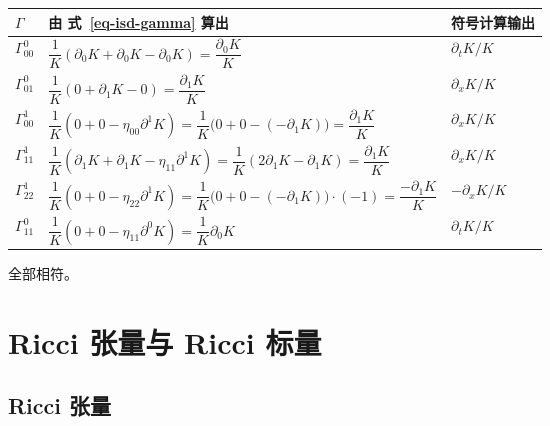 \documentclass[
  chinese,
  a4paper,
  UTF8,
  12pt,
  oneside,
  openany]{ctexbook}
\newcounter{none} %
\theoremstyle{plain}
\theoremstyle{plain}
\theoremstyle{plain}
\theoremstyle{definition}
\theoremstyle{plain}
\theoremstyle{plain}
\theoremstyle{remark}
\begin{document}
{\def\LTcaptype{none} %
\begin{longtable}[]{@{}
  >{\raggedright\arraybackslash}p{}
  >{\raggedright\arraybackslash}p{}
  >{\raggedright\arraybackslash}p{}@{}}
\toprule\noalign{}
\begin{minipage}[b]{\linewidth}\raggedright
\(\Gamma\)
\end{minipage} & \begin{minipage}[b]{\linewidth}\raggedright
由 式~\ref{eq-isd-gamma} 算出
\end{minipage} & \begin{minipage}[b]{\linewidth}\raggedright
符号计算输出
\end{minipage} \\
\midrule\noalign{}
\endhead
\bottomrule\noalign{}
\endlastfoot
\(\Gamma^{0}_{00}\) &
\(\dfrac{1}{K}(\partial_0K+\partial_0K-\partial_0K)=\dfrac{\partial_0K}{K}\)
& \(\partial_tK/K\) \\
\(\Gamma^{0}_{01}\) &
\(\dfrac{1}{K}(0+\partial_1K-0)=\dfrac{\partial_1K}{K}\) &
\(\partial_xK/K\) \\
\(\Gamma^{1}_{00}\) &
\(\dfrac{1}{K}(0+0-\eta_{00}\partial^{1}K)=\dfrac{1}{K}\bigl(0+0-(-\partial_1K)\bigr)=\dfrac{\partial_1K}{K}\)
& \(\partial_xK/K\) \\
\(\Gamma^{1}_{11}\) &
\(\dfrac{1}{K}(\partial_1K+\partial_1K-\eta_{11}\partial^{1}K)=\dfrac{1}{K}(2\partial_1K-\partial_1K)=\dfrac{\partial_1K}{K}\)
& \(\partial_xK/K\) \\
\(\Gamma^{1}_{22}\) &
\(\dfrac{1}{K}(0+0-\eta_{22}\partial^{1}K)=\dfrac{1}{K}\bigl(0+0-(-\partial_1K)\bigr)\cdot(-1)=\dfrac{-\partial_1K}{K}\)
& \(-\partial_xK/K\) \\
\(\Gamma^{0}_{11}\) &
\(\dfrac{1}{K}(0+0-\eta_{11}\partial^{0}K)=\dfrac{1}{K}\partial_0K\) &
\(\partial_tK/K\) \\
\end{longtable}
}

全部相符。

\section{Ricci 张量与 Ricci 标量}\label{sec-isd-ricci}

\subsection{Ricci 张量}\label{ricci-ux5f20ux91cf}
\end{document}
